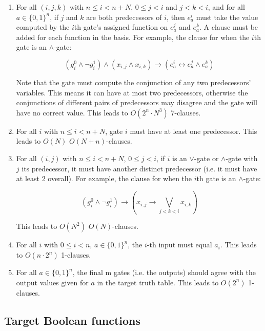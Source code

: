 \documentclass{article}
\begin{document}
\begin{enumerate}
  \item For all \((i,j,k)\) with \(n \leq i < n+N\), \(0 \leq j < i\) and \(j < k < i\), and for all \(a\in\{0,1\}^n\), if \(j\) and \(k\) are both predecessors of \(i\), then \(e^i_a\) must take the value computed by the \(i\)th gate's assigned function on \(e^j_a\) and \(e^k_a\). A clause must be added for each function in the basis. For example, the clause for when the \(i\)th gate is an \(\land\)-gate:

\[
(g^0_i\wedge \neg g^1_i)\wedge 
(x_{i,j}\wedge x_{i,k})\rightarrow 
(e^i_a\leftrightarrow e^j_a\wedge e^k_a)
\]
  
  Note that the gate must compute the conjunction of any two predecessors' variables. This means it can have at most two predecessors, otherwise the conjunctions of different pairs of predecessors may disagree and the gate will have no correct value. This leads to \(O(2^n\cdot N^3)\) 7-clauses.

  \item For all \(i\) with \(n \leq i < n+N\), gate \(i\) must have at least one predecessor. This leads to \(O(N)\) \(O(N+n)\)-clauses.

  \item For all \((i,j)\) with \(n \leq i < n+N\), \(0 \leq j < i\), if \(i\) is an \(\lor\)-gate or \(\land\)-gate with \(j\) its predecessor, it must have another distinct predecessor (i.e. it must have at least 2 overall). For example, the clause for when the \(i\)th gate is an \(\land\)-gate:

\[
(g^0_i \land \neg g^1_i) \rightarrow \left( x_{i,j} \rightarrow \bigvee_{j<k<i} x_{i,k} \right)
\]

  This leads to \(O(N^2)\) \(O(N)\)-clauses.

  \item For all \(i\) with \(0 \leq i < n\), \(a\in\{0,1\}^n\), the \(i\)-th input must equal \(a_i\). This leads to \(O(n \cdot 2^n)\) 1-clauses.

  \item For all \(a\in\{0,1\}^n\), the final m gates (i.e. the outputs) should agree with the output values given for \(a\) in the target truth table. This leads to \(O(2^n)\) 1-clauses.

\end{enumerate}

\subsection{Target Boolean functions}
\end{document}
